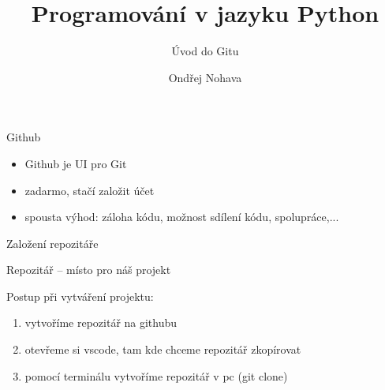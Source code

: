 \documentclass{beamer}
\title{Programování v jazyku Python}
\subtitle{Úvod do Gitu}
\author{Ondřej Nohava}
\institute[DDMJH]{Dům dětí a mládeže Jindřichův Hradec}
\date{}
\begin{document}
\begin{frame}
\titlepage
\end{frame}

\begin{frame}[t]{Github}



\begin{itemize}
	\item Github je UI pro Git
	
	\item zadarmo, stačí založit účet
	
	\item spousta výhod: záloha kódu, možnost sdílení kódu, spolupráce,...
\end{itemize}



\end{frame}



\begin{frame}[t]{Založení repozitáře}

	Repozitář -- místo pro náš projekt
	
	
	\vspace{0.3cm}	
	Postup při vytváření projektu:
\begin{enumerate}

	\item vytvoříme repozitář na githubu
	
	\item otevřeme si vscode, tam kde chceme repozitář zkopírovat
	
	\item pomocí terminálu vytvoříme repozitář v pc (git clone)

\end{enumerate}	
\end{frame}
\end{document}
